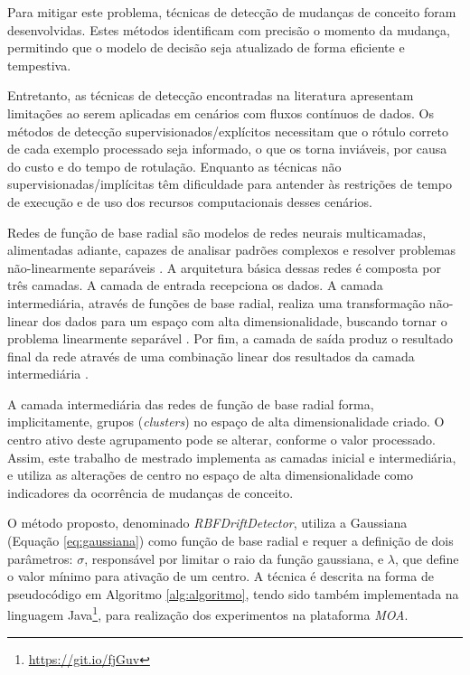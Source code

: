 \documentclass[qual, classic, a4paper]{ufbathesis}
\begin{document}
Para mitigar este problema, técnicas de detecção de mudanças de conceito foram desenvolvidas. 
Estes métodos identificam com precisão o momento da mudança, permitindo que o modelo de decisão seja atualizado de forma eficiente e tempestiva.

Entretanto, as técnicas de detecção encontradas na literatura apresentam limitações ao serem aplicadas em cenários com fluxos contínuos de dados.
Os métodos de detecção supervisionados/explícitos necessitam que o rótulo correto de cada exemplo processado seja informado, o que os torna inviáveis, por causa do custo e do tempo de rotulação.
Enquanto as técnicas não supervisionadas/implícitas têm dificuldade para antender às restrições de tempo de execução e de uso dos recursos computacionais desses cenários.

Redes de função de base radial são modelos de redes neurais multicamadas, alimentadas adiante, capazes de analisar padrões complexos e resolver problemas não-linearmente separáveis \cite{Braga:RedesNeuraisTeoriaAplicacoes}.
A arquitetura básica dessas redes é composta por três camadas.
A camada de entrada recepciona os dados.
A camada intermediária, através de funções de base radial, realiza uma transformação não-linear dos dados para um espaço com alta dimensionalidade, buscando tornar o problema linearmente separável \cite{cover1965browse}.
Por fim, a camada de saída produz o resultado final da rede através de uma combinação linear dos resultados da camada intermediária \cite{Rojas:1996:NNS:235222}.

A camada intermediária das redes de função de base radial forma, implicitamente, grupos (\textit{clusters}) no espaço de alta dimensionalidade criado.
O centro ativo deste agrupamento pode se alterar, conforme o valor processado.
Assim, este trabalho de mestrado implementa as camadas inicial e intermediária, 
e utiliza as alterações de centro no espaço de alta dimensionalidade como indicadores da ocorrência de mudanças de conceito.

O método proposto, denominado \textit{RBFDriftDetector}, utiliza a Gaussiana (Equação \ref{eq:gaussiana}) como função de base radial e requer a definição de dois parâmetros: 
\textit{$\sigma$}, responsável por limitar o raio da função gaussiana, e \textit{$\lambda$}, que define o valor mínimo para ativação de um centro.
A técnica é descrita na forma de pseudocódigo em Algoritmo \ref{alg:algoritmo}, 
tendo sido também implementada na linguagem Java\footnote{\url{https://git.io/fjGuv}}, para realização dos experimentos na plataforma \textit{MOA}.
\end{document}
